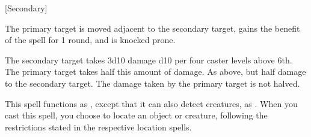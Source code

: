\begin{spellheader}
    \begin{spelltargetinginfo}
    \end{spelltargetinginfo}
    \begin{spelleffects}
        \begin{spelltargetinginfo}
            [Secondary]
        \end{spelltargetinginfo}
    \end{spelleffects}
\end{spellheader}
\begin{spellcontent}
    \spelleffect The primary target is moved adjacent to the secondary target, gains the benefit of the  spell for 1 round, and is knocked prone.
    \begin{spellmargin}
        \spellsuccess The secondary target takes 3d10 damage \add d10 per four caster levels above 6th. The primary target takes half this amount of damage.
        \spellfailure As above, but half damage to the secondary target. The damage taken by the primary target is not halved.
    \end{spellmargin}
\end{spellcontent}
\begin{spellfooter}

\end{spellfooter}

\begin{spellheader}
\end{spellheader}
\spellrng{\rngext}
\spelleffect This spell functions as , except that it can also detect creatures, as . When you cast this spell, you choose to locate an object or creature, following the restrictions stated in the respective location spells.

